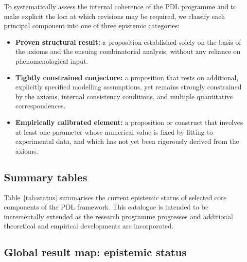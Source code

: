 \documentclass{article}
\begin{document}
To systematically assess the internal coherence of the PDL programme and to make explicit the loci at which revisions may be required, we classify each principal component into one of three epistemic categories:
\begin{itemize}[leftmargin=1.5em]
  \item \textbf{Proven structural result:} a proposition established solely on the basis of the axioms and the ensuing combinatorial analysis, without any reliance on phenomenological input.
  \item \textbf{Tightly constrained conjecture:} a proposition that rests on additional, explicitly specified modelling assumptions, yet remains strongly constrained by the axioms, internal consistency conditions, and multiple quantitative correspondences.
  \item \textbf{Empirically calibrated element:} a proposition or construct that involves at least one parameter whose numerical value is fixed by fitting to experimental data, and which has not yet been rigorously derived from the axioms.
\end{itemize}

\subsection{Summary tables}
\label{subsec:summary_tables}

Table~\ref{tab:status} summarises the current epistemic status of selected core components of the PDL framework. This catalogue is intended to be incrementally extended as the research programme progresses and additional theoretical and empirical developments are incorporated.

\setlength{\LTpre}{18pt}
\setlength{\LTpost}{0pt}

\subsection{Global result map: epistemic status}
\label{subsec:global_status}
\end{document}
